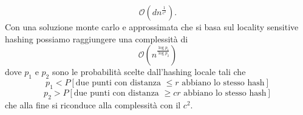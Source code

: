 \documentclass[11pt]{scrartcl}
\newcommand{\bigo}{\mathcal{O}}
\begin{document}
	$$\bigo(dn^{\frac{1}{c^2}}).$$
	Con una soluzione monte carlo e approssimata che si basa sul locality sensitive hashing possiamo raggiungere una complessità di 
	$$\bigo\left(n^{\frac{\log p_1}{\log p_2}}\right)$$
	dove $p_1$ e $p_2$ sono le probabilità scelte dall'hashing locale tali che
	$$p_1<P[\text{due punti con distanza $\le r$ abbiano lo stesso hash}]$$
	$$p_2>P[\text{due punti con distanza $\ge cr$ abbiano lo stesso hash}]$$
	che alla fine si riconduce alla complessità con il $c^2$.
	
\end{document}
